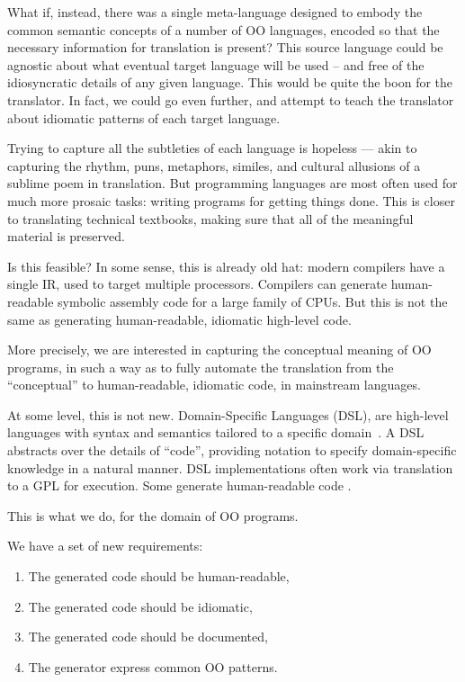 \documentclass[sigplan,review,anonymous,prologue,dvipsnames]{acmart}
\begin{document}
What if, instead, there was a single meta-language designed to embody
the common semantic concepts of a number of OO languages, encoded so that the
necessary information for translation is present?  This source language could
be agnostic about what eventual target language will be used -- and free of
the idiosyncratic details of any given language.  This would be quite the boon
for the translator.  In fact, we could go even further, and attempt to
teach the translator about idiomatic patterns of each target language.

Trying to capture all the subtleties of each language is hopeless ---
akin to capturing the rhythm, puns, metaphors, similes,
and cultural allusions of a sublime poem in translation.  But programming
languages are most often used for much more prosaic tasks: writing programs
for getting things done. This is closer to translating technical textbooks,
making sure that all of the meaningful material is preserved.

Is this feasible? In some sense, this is already old hat:
modern compilers have a single IR,
used to target multiple processors. Compilers can generate
human-readable symbolic assembly code for a large family of CPUs. But this
is not the same as generating human-readable, idiomatic high-level
code.

More precisely, we are interested in capturing the conceptual meaning of
OO programs, in such a way as to fully automate the translation from
the ``conceptual'' to human-readable, idiomatic code, in mainstream
languages.

At some level, this is not new.  Domain-Specific Languages (DSL),
are high-level languages with syntax and semantics tailored to a specific
domain~\cite{mernik2005and}.  A DSL
abstracts over the details of ``code'', providing notation to
specify domain-specific knowledge in a natural manner. DSL implementations
often work via translation to a GPL for execution.  Some generate
human-readable code \cite{wang1997zephyr, mooij2013gaining, hong2012green, 
beyak2011saga}.

This is what we do, for the domain of OO programs.

We have a set of new requirements:
\begin{enumerate}
\item The generated code should be human-readable,
\item The generated code should be idiomatic,
\item The generated code should be documented,
\item The generator express common OO patterns.
\end{enumerate}
\end{document}
